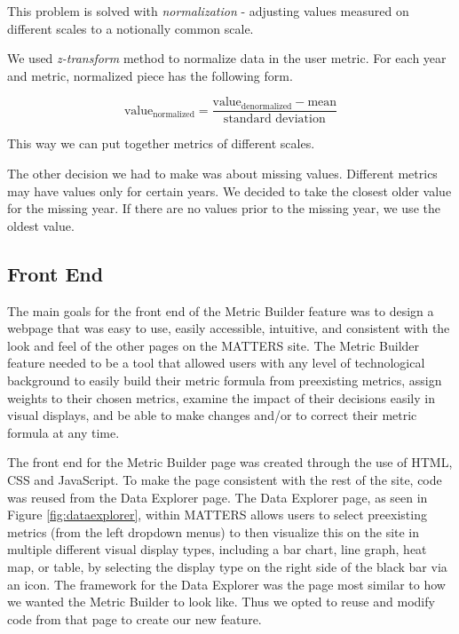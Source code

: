 				This problem is solved with \emph{normalization} - adjusting values measured on different scales to a notionally common scale.
				
				We used \emph{z-transform} method to normalize data in the user metric. For each year and metric, normalized piece has the following form.
				
				\[
					\text{value}_\text{normalized} = \frac{\text{value}_\text{denormalized} - \text{mean}}{\text{standard deviation}}
				\]
				
				This way we can put together metrics of different scales.
				
				The other decision we had to make was about missing values. Different metrics may have values only for certain years. We decided to take the closest older value for the missing year. If there are no values prior to the missing year, we use the oldest value. 

		\subsection{Front End}
		
			The main goals for the front end of the Metric Builder feature was to design a webpage 
			that was easy to use, easily accessible, intuitive, and consistent 
			with the look and feel of the other pages on the MATTERS site. 
			The Metric Builder feature needed to be a tool that allowed users with any level of 
			technological background to easily build their metric formula from preexisting metrics, 
			assign weights to their chosen metrics, examine the impact of their decisions easily in visual displays, and be able to make changes and/or to correct their metric formula at any time.
			
			The front end for the Metric Builder page was created through the use of HTML, CSS and JavaScript. 
			To make the page consistent with the rest of the site, code was reused from the Data Explorer page. 
			The Data Explorer page, as seen in Figure \ref{fig:dataexplorer}, within MATTERS allows users to select 
			preexisting metrics (from the left dropdown menus) to then visualize this on the site in multiple different visual display types, 
			including a bar chart, line graph, heat map, or table, by selecting the display type on the right side of the black bar via an icon. The framework for the 
			Data Explorer was the page most similar to how we wanted the Metric Builder to look like. Thus we opted to 
			reuse and modify code from that page to create our new feature. 
			
